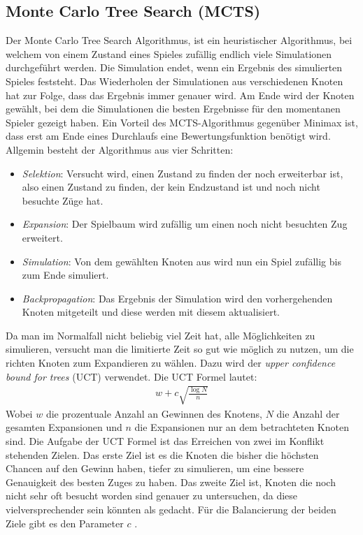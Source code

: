 \documentclass[12pt,a4paper,bibliography=totocnumbered,listof=totocnumbered]{article}
\begin{document}
\subsection{Monte Carlo Tree Search (MCTS)}
\label{chap:MCTS}
Der Monte Carlo Tree Search Algorithmus, ist ein heuristischer Algorithmus, bei welchem von einem
Zustand eines Spieles zufällig endlich viele Simulationen durchgeführt werden. Die Simulation endet, wenn
ein Ergebnis des simulierten Spieles feststeht. Das Wiederholen der Simulationen aus verschiedenen Knoten
hat zur Folge, dass das Ergebnis immer genauer wird. Am Ende wird der Knoten gewählt, bei dem die 
Simulationen die besten Ergebnisse für den momentanen Spieler gezeigt haben. Ein Vorteil des 
MCTS-Algorithmus gegenüber Minimax ist, dass erst am Ende eines Durchlaufs eine Bewertungsfunktion
benötigt wird. Allgemin besteht der Algorithmus aus vier Schritten:
\begin{itemize}
    \item \textit{Selektion}: Versucht wird, einen Zustand zu finden der noch erweiterbar ist, also
        einen Zustand zu finden, der kein Endzustand ist und noch nicht besuchte Züge hat.
    \item \textit{Expansion}: Der Spielbaum wird zufällig um einen noch nicht besuchten Zug erweitert.
    \item \textit{Simulation}: Von dem gewählten Knoten aus wird nun ein Spiel zufällig bis zum Ende 
        simuliert. 
    \item \textit{Backpropagation}: Das Ergebnis der Simulation wird den vorhergehenden Knoten mitgeteilt
        und diese werden mit diesem aktualisiert.
\end{itemize}
Da man im Normalfall nicht beliebig viel Zeit hat, alle Möglichkeiten zu simulieren, versucht man die limitierte Zeit
so gut wie möglich zu nutzen, um die richten Knoten zum Expandieren zu wählen. Dazu wird der \textit{upper confidence bound for trees} (UCT) verwendet.
Die UCT Formel lautet:
\begin{align}
	w + c \sqrt{\frac{\log{N}}{n}}
\end{align}
Wobei $w$ die prozentuale Anzahl an Gewinnen des Knotens, $N$ die Anzahl der gesamten Expansionen und $n$ die Expansionen nur an dem 
betrachteten Knoten sind. Die Aufgabe der UCT Formel ist das Erreichen von zwei im Konflikt stehenden Zielen. Das erste Ziel ist es die Knoten die bisher die 
höchsten Chancen auf den Gewinn haben, tiefer zu simulieren, um eine bessere Genauigkeit des besten Zuges zu haben.
Das zweite Ziel ist, Knoten die noch nicht sehr oft besucht worden sind genauer zu untersuchen, da diese vielversprechender sein könnten als gedacht.
Für die Balancierung der beiden Ziele gibt es den Parameter $c$ \cite{DeepLearingGo}.
\end{document}
